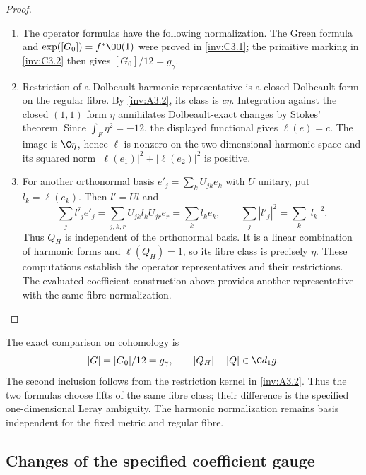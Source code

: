 \begin{proof}
\begin{enumerate}[label=\arabic*.,leftmargin=*]
\item The operator formulas have the following normalization.
The Green formula and $\exp([G_0])=f^*\OO(1)$ were proved in
\ref{inv:C3.1}; the primitive marking in \ref{inv:C3.2} then gives
$[G_0]/12=g_\gamma$.

\item Restriction of a Dolbeault-harmonic representative is a closed
Dolbeault form on the regular fibre. By \ref{inv:A3.2}, its class
is $c\eta$. Integration against the closed $(1,1)$ form $\eta$
annihilates Dolbeault-exact changes by Stokes' theorem. Since
$\int_F\eta^2=-12$, the displayed functional gives $\ell(e)=c$.
The image is $\C\eta$, hence $\ell$ is nonzero on the
 two-dimensional harmonic space and its squared norm
$|\ell(e_1)|^2+|\ell(e_2)|^2$ is positive.

\item For another orthonormal basis $e'_j=\sum_k U_{jk}e_k$ with
$U$ unitary, put $l_k=\ell(e_k)$. Then $l'=Ul$ and
\[
 \sum_j\overline{l'_j}e'_j
 =\sum_{j,k,r}\overline{U_{jk}}\bar l_k U_{jr}e_r
 =\sum_k\bar l_ke_k,
 \qquad \sum_j|l'_j|^2=\sum_k|l_k|^2.
\]
Thus $Q_H$ is independent of the orthonormal basis. It is a linear
combination of harmonic forms and $\ell(Q_H)=1$, so its fibre class
is precisely $\eta$. These computations establish the operator
representatives and their restrictions. The evaluated coefficient
construction above provides another representative with the same
fibre normalization.
\end{enumerate}
\end{proof}

The exact comparison on cohomology is
\[
 [G]=[G_0]/12=g_\gamma,\qquad
 [Q_H]-[Q]\in\C d_1g.
\]
The second inclusion follows from the restriction kernel in
\cref{inv:A3.2}.  Thus the two formulas choose lifts of the same fibre
class; their difference is the specified one-dimensional Leray
ambiguity.  The harmonic normalization remains basis independent for
the fixed metric and regular fibre.



\subsection{Changes of the specified coefficient gauge}

